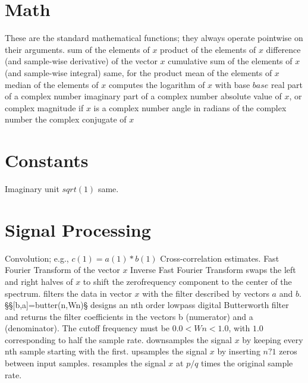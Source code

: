 \section{Math}{}
	{These are the standard mathematical functions; they always operate pointwise on their arguments.}
	{sum of the elements of $x$}
	{product of the elements of $x$}
	{difference (and sample-wise derivative) of the vector $x$}
	{cumulative sum of the elements of $x$ (and sample-wise integral)}
	{same, for the product}
	{mean of the elements of $x$}
	{median of the elements of $x$}
	{computes the logarithm of $x$ with base $base$}
	{real part of a complex number}
	{imaginary part of a complex number}
	{absolute value of $x$, or complex magnitude if $x$ is a complex number}
	{angle in radians of the complex number}
	{the complex conjugate of $x$}

\section{Constants}{}
	{Imaginary unit $sqrt(1)$}
	{same.}

\section{Signal Processing}{}
	{Convolution; e.g., $c(1)=a(1)*b(1)$}
	{Cross-correlation estimates.}
	{Fast Fourier Transform of the vector $x$}
	{Inverse Fast Fourier Transform}
	{swaps the left and right halves of $x$ to shift the zerofrequency component to the center of the spectrum.}
	{filters the data in vector $x$ with the filter described by vectors $a$ and $b$.}
§§[b,a]=butter(n,Wn)§ designs an nth order lowpass digital Butterworth filter and returns the filter coefficients in the vectors b (numerator) and a (denominator). The cutoff frequency must be $0.0 < Wn < 1.0$, with $1.0$ corresponding to half the sample rate.
	{downsamples the signal $x$ by keeping every nth sample starting with the first.}
	{upsamples the signal $x$ by inserting $n?1$ zeros between input samples.}
	{resamples the signal $x$ at $p/q$ times the original sample rate.}

